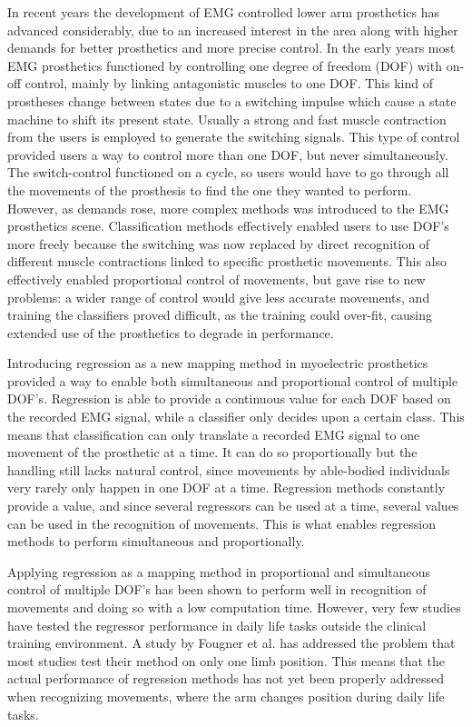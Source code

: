 In recent years the development of EMG controlled lower arm prosthetics has advanced considerably, due to an increased interest in the area along with higher demands for better prosthetics and more precise control. \cite{Fougner2012} In the early years most EMG prosthetics functioned by controlling one degree of freedom (DOF) with on-off control, mainly by linking antagonistic muscles to one DOF. This kind of prostheses change between states due to a switching impulse which cause a state machine to shift its present state. Usually a strong and fast muscle contraction from the users is employed to generate the switching signals. \cite{amsuess2014}
This type of control provided users a way to control more than one DOF, but never simultaneously. The switch-control functioned on a cycle, so users would have to go through all the movements of the prosthesis to find the one they wanted to perform. However, as demands rose, more complex methods was introduced to the EMG prosthetics scene. Classification methods effectively enabled users to use DOF's more freely because the switching was now replaced by direct recognition of different muscle contractions linked to specific prosthetic movements. This also effectively enabled proportional control of movements, but gave rise to new problems: a wider range of control would give less accurate movements, and training the classifiers proved difficult, as the training could over-fit, causing extended use of the prosthetics to degrade in performance. \cite{Ison2016}

Introducing regression as a new mapping method in myoelectric prosthetics provided a way to enable both simultaneous and proportional control of multiple DOF's. Regression is able to provide a continuous value for each DOF based on the recorded EMG signal, while a classifier only decides upon a certain class. \cite{hahne2014, jiang2010}
This means that classification can only translate a recorded EMG signal to one movement of the prosthetic at a time. It can do so proportionally but the handling still lacks natural control, since movements by able-bodied individuals very rarely only happen in one DOF at a time. Regression methods constantly provide a value, and since several regressors can be used at a time, several values can be used in the recognition of movements. This is what enables regression methods to perform simultaneous and proportionally. 

Applying regression as a mapping method in proportional and simultaneous control of multiple DOF's has been shown to perform well in recognition of movements and doing so with a low computation time. \cite{hahne2014} However, very few studies have tested the regressor performance in daily life tasks outside the clinical training environment. \cite{jiang2012} A study by Fougner et al. \cite{Fougner2011} has addressed the problem that most studies test their method on only one limb position. This means that the actual performance of regression methods has not yet been properly addressed when recognizing movements, where the arm changes position during daily life tasks. 

